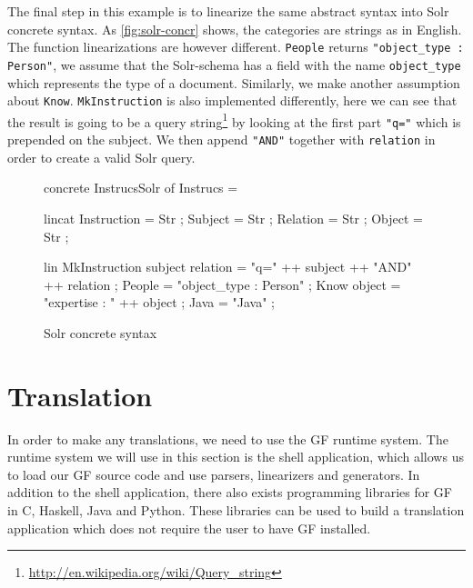 
The final step in this example is to linearize the same abstract syntax into Solr concrete syntax.
  As \autoref{fig:solr-concr} shows, the categories are strings as in English. The function linearizations are however
  different. \texttt{People} returns 
  \texttt{"object\_type : Person"}, we assume that 
  the Solr-schema has a field with the name \texttt{object\_type} which represents 
  the type of a document. Similarly, we make another assumption about \texttt{Know}. \texttt{MkInstruction} is also implemented differently, here we can see that the result is going to be a query string\footnote{\url{http://en.wikipedia.org/wiki/Query\_string}} by looking at the first part \texttt{"q="} which is prepended on the subject. We then append \texttt{"AND"} together with \texttt{relation} in order to create a valid Solr query.

\begin{figure}[h]
\begin{code}
concrete InstrucsSolr of Instrucs = {
    lincat
      Instruction = Str ;
      Subject = Str ;
      Relation = Str ;
      Object = Str ;

    lin
      MkInstruction subject relation = "q=" ++ subject ++ "AND" ++ relation ;
      People = "object_type : Person" ;
      Know object = "expertise : " ++ object ;
      Java = "Java" ;
}
\end{code}
\caption{Solr concrete syntax\label{fig:solr-concr}}
\end{figure}

\section{Translation}

In order to make any translations, we need to use the GF runtime system. The  runtime system we will use in this section is the shell application, which allows us to load our GF source code and use parsers, linearizers and generators. In addition to the shell application, there also exists programming libraries for GF in C, Haskell, Java and Python. These libraries can be used to build a translation application which does not require the user to have GF installed.

